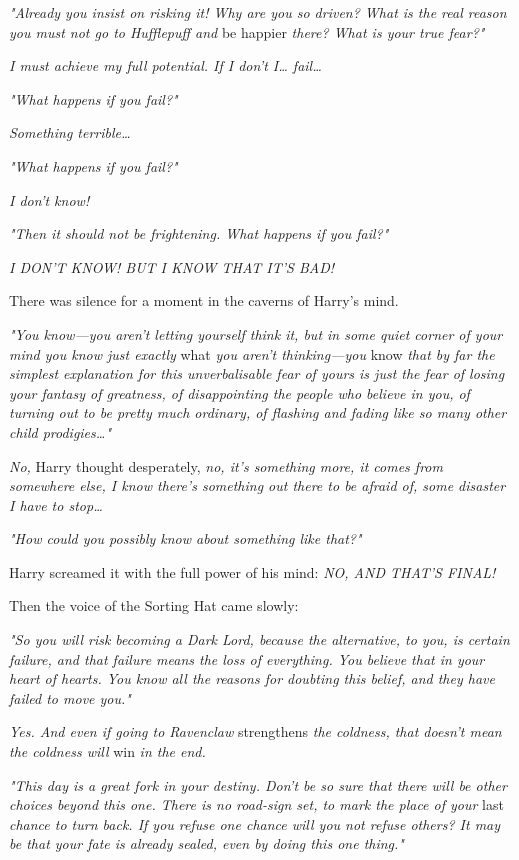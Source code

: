 \emph{"Already you insist on risking it! Why are you so driven? What is the 
real reason you must not go to Hufflepuff and} be happier\emph{ there? What is 
your true fear?"}

\emph{I must achieve my full potential. If I don't I{\ldots} fail{\ldots}}

\emph{"What happens if you fail?"}

\emph{Something terrible{\ldots}}

\emph{"What happens if you fail?"}

\emph{I don't know!}

\emph{"Then it should not be frightening. What happens if you fail?"}

\emph{I DON'T KNOW! BUT I KNOW THAT IT'S BAD!}

There was silence for a moment in the caverns of Harry's mind.

\emph{"You know---you aren't letting yourself think it, but in some quiet 
corner of your mind you know just exactly} what\emph{ you aren't 
thinking---you} know \emph{that by far the simplest explanation for this 
unverbalisable fear of yours is just the fear of losing your fantasy of 
greatness, of disappointing the people who believe in you, of turning out to be 
pretty much ordinary, of flashing and fading like so many other child 
prodigies{\ldots}"}

\emph{No,} Harry thought desperately, \emph{no, it's something more, it comes 
from somewhere else, I know there's something out there to be afraid of, some 
disaster I have to stop{\ldots}}

\emph{"How could you possibly know about something like that?"}

Harry screamed it with the full power of his mind: \emph{NO, AND THAT'S FINAL!}

Then the voice of the Sorting Hat came slowly:

\emph{"So you will risk becoming a Dark Lord, because the alternative, to you, 
is certain failure, and that failure means the loss of everything. You believe 
that in your heart of hearts. You know all the reasons for doubting this 
belief, and they have failed to move you."}

\emph{Yes. And even if going to Ravenclaw} strengthens\emph{ the coldness, that 
doesn't mean the coldness will} win\emph{ in the end.}

\emph{"This day is a great fork in your destiny. Don't be so sure that there 
will be other choices beyond this one. There is no road-sign set, to mark the 
place of your} last\emph{ chance to turn back. If you refuse one chance will 
you not refuse others? It may be that your fate is already sealed, even by 
doing this one thing."}

